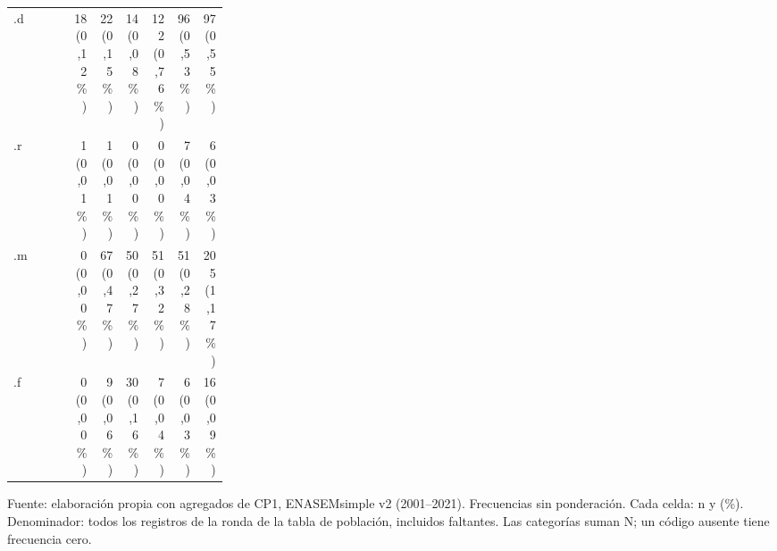 \begin{table}[!htbp]
\begin{tabular}{p{0.28\linewidth}rrrrrr}
.d & \shortstack[r]{18\\(0,12\%)} & \shortstack[r]{22\\(0,15\%)} & \shortstack[r]{14\\(0,08\%)} & \shortstack[r]{122\\(0,76\%)} & \shortstack[r]{96\\(0,53\%)} & \shortstack[r]{97\\(0,55\%)} \\
.r & \shortstack[r]{1\\(0,01\%)} & \shortstack[r]{1\\(0,01\%)} & \shortstack[r]{0\\(0,00\%)} & \shortstack[r]{0\\(0,00\%)} & \shortstack[r]{7\\(0,04\%)} & \shortstack[r]{6\\(0,03\%)} \\
.m & \shortstack[r]{0\\(0,00\%)} & \shortstack[r]{67\\(0,47\%)} & \shortstack[r]{50\\(0,27\%)} & \shortstack[r]{51\\(0,32\%)} & \shortstack[r]{51\\(0,28\%)} & \shortstack[r]{205\\(1,17\%)} \\
.f & \shortstack[r]{0\\(0,00\%)} & \shortstack[r]{9\\(0,06\%)} & \shortstack[r]{30\\(0,16\%)} & \shortstack[r]{7\\(0,04\%)} & \shortstack[r]{6\\(0,03\%)} & \shortstack[r]{16\\(0,09\%)} \\
\bottomrule
\end{tabular}
\par\medskip
\parbox{\linewidth}{\footnotesize Fuente: elaboración propia con agregados de CP1, ENASEMsimple v2 (2001--2021). Frecuencias sin ponderación. Cada celda: n y (\%). Denominador: todos los registros de la ronda de la tabla de población, incluidos faltantes. Las categorías suman N; un código ausente tiene frecuencia cero.}
\end{table}
